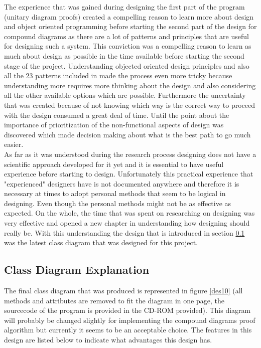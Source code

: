 \documentclass[10pt, a4paper, titlepage]{article}
\begin{document}
The experience that was gained during designing the first part of the program (unitary diagram proofs) created a compelling reason to learn more about design and object oriented programming before starting the second part of the design for compound diagrams as there are a lot of patterns and principles that are useful for designing such a system. This conviction was a compelling reason to learn as much about design as possible in the time available before starting the second stage of the project. Understanding objected oriented design principles and also all the 23 patterns included in \cite{Gof_book} made the process even more tricky because understanding more requires more thinking about the design and also considering all the other available options which are possible. Furthermore the uncertainty that was created because of not knowing which way is the correct way to proceed with the design consumed a great deal of time. Until the point about the importance of prioritization of the non-functional aspects of design was discovered which made decision making about what is the best path to go much easier.\\

As far as it was understood during the research process designing does not have a scientific approach developed for it yet and it is essential to have useful experience before starting to design. Unfortunately this practical experience that "experienced" designers have is not documented anywhere and therefore it is necessary at times to adopt personal methods that seem to be logical in designing. Even though the personal methods might not be as effective as expected. On the whole, the time that was spent on researching on designing was very effective and opened a new chapter in understanding how designing should really be. With this understanding the design that is introduced in section \ref{class_diagram} was the latest class diagram that was designed for this project.    

\subsection{Class Diagram Explanation}
\label{class_diagram}
The final class diagram that was produced is represented in figure \ref{des10} (all methods and attributes are removed to fit the diagram in one page, the sourcecode of the program is provided in the CD-ROM provided). This diagram will probably be changed slightly for implementing the compound diagrams proof algorithm but currently it seems to be an acceptable choice. The features in this design are listed below to indicate what advantages this design has.
\end{document}
